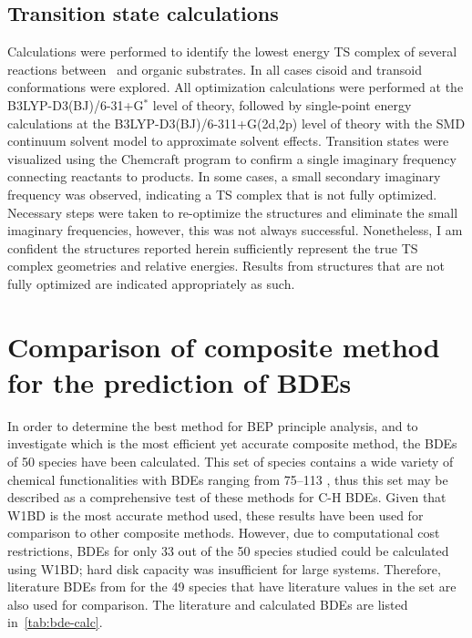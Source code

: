 \subsection{Transition state calculations}

Calculations were performed to identify the lowest energy TS complex of several reactions between \cumo\ and organic substrates. In all cases cisoid and transoid conformations were explored. All optimization calculations were performed at the B3LYP-D3(BJ)/6-31+G$^*$ level of theory, followed by single-point energy calculations at the B3LYP-D3(BJ)/6-311+G(2d,2p) level of theory with the SMD continuum solvent model\cite{Marenich2009} to approximate solvent effects. Transition states were visualized using the Chemcraft program\cite{ccraft} to confirm a single imaginary frequency connecting reactants to products. In some cases, a small secondary imaginary frequency was observed, indicating a TS complex that is not fully optimized. Necessary steps were taken to re-optimize the structures and eliminate the small imaginary frequencies, however, this was not always successful. Nonetheless, I am confident the structures reported herein sufficiently represent the true TS complex geometries and relative energies. Results from structures that are not fully optimized are indicated appropriately as such.

\section{Comparison of composite method for the prediction of BDEs}

In order to determine the best method for BEP principle analysis, and to investigate which is the most efficient yet accurate composite method, the BDEs of 50 species have been calculated. This set of species contains a wide variety of chemical functionalities with BDEs ranging from 75--113 \kcalmol, thus this set may be described as a comprehensive test of these methods for C-H BDEs. Given that W1BD is the most accurate method used, these results have been used for comparison to other composite methods. However, due to computational cost restrictions, BDEs for only 33 out of the 50 species studied could be calculated using W1BD; hard disk capacity was insufficient for large systems. Therefore, literature BDEs from \citet{Luo2002} for the 49 species that have literature values in the set are also used for comparison. The literature and calculated BDEs are listed in~\ref{tab:bde-calc}.

